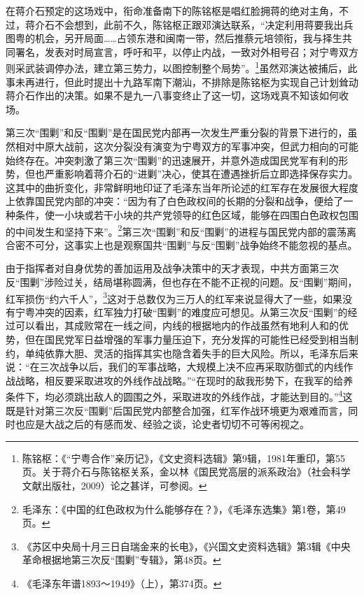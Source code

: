 在蒋介石预定的这场戏中，衔命准备南下的陈铭枢是唱红脸拥蒋的绝对主角，不过，蒋介石不会想到，此前不久，陈铭枢正跟邓演达联系，“决定利用蒋要我出兵图粤的机会，另开局面……占领东港和闽南一带，然后推蔡元培领衔，我与择生共同署名，发表对时局宣言，呼吁和平，以停止内战，一致对外相号召；对宁粤双方则采武装调停办法，建立第三势力，以图控制整个局势”。\footnote{陈铭枢：《“宁粤合作”亲历记》，《文史资料选辑》第9辑，1981年重印，第55页。关于蒋介石与陈铭枢关系，金以林《国民党高层的派系政治》（社会科学文献出版社，2009）论之甚详，可参阅。}虽然邓演达被捕后，此事未再进行，但此时提出十九路军南下潮汕，不排除是陈铭枢为实现自己计划耸动蒋介石作出的决策。如果不是九一八事变终止了这一切，这场戏真不知该如何收场。


第三次“围剿”和反“围剿”是在国民党内部再一次发生严重分裂的背景下进行的，虽然相对中原大战前，这次分裂没有演变为宁粤双方的军事冲突，但武力相向的可能始终存在。冲突刺激了第三次“围剿”的迅速展开，并意外造成国民党军有利的形势，但也严重影响着蒋介石的“进剿”决心，使其在遭遇挫折后立即选择保存实力。这其中的曲折变化，非常鲜明地印证了毛泽东当年所论述的红军存在发展很大程度上依靠国民党内部的冲突：“因为有了白色政权间的长期的分裂和战争，便给了一种条件，使一小块或若干小块的共产党领导的红色区域，能够在四围白色政权包围的中间发生和坚持下来”。\footnote{毛泽东：《中国的红色政权为什么能够存在？》，《毛泽东选集》第1卷，第49页。}第三次“围剿”和反“围剿”的进程与国民党内部的震荡离合密不可分，这事实上也是观察国共“围剿”与反“围剿”战争始终不能忽视的基点。


由于指挥者对自身优势的善加运用及战争决策中的天才表现，中共方面第三次反“围剿”涉险过关，结局堪称圆满，但也存在不能不正视的问题。反“围剿”期间，红军损伤“约六千人”，\footnote{《苏区中央局十月三日自瑞金来的长电》，《兴国文史资料选辑》第3辑《中央革命根据地第三次反“围剿”专辑》，第48页。}这对于总数仅为三万人的红军来说显得大了一些，如果没有宁粤冲突的因素，红军独力打破“围剿”的难度应可想见。从第三次反“围剿”的经过可以看出，其成败常在一线之间，内线的根据地内的作战虽然有地利人和的优势，但在国民党军日益增强的军事力量压迫下，充分发挥的可能性已经受到相当制约，单纯依靠大胆、灵活的指挥其实也隐含着失手的巨大风险。所以，毛泽东后来说：“在三次战争以后，我们的军事战略，大规模上决不应再采取防御式的内线作战战略，相反要采取进攻的外线作战战略。”“在现时的敌我形势下，在我军的给养条件下，均必须跳出敌人的圆围之外，采取进攻的外线作战，才能达到目的。”\footnote{《毛泽东年谱1893～1949》（上），第374页。}这既是针对第三次反“围剿”后国民党内部整合加强，红军作战环境更为艰难而言，同时也应是大战之后的有感而发、经验之谈，论史者切切不可等闲视之。


